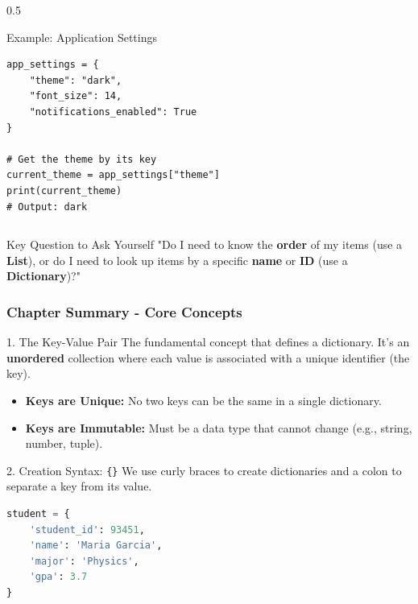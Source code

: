 \documentclass{beamer}
\begin{document}
\begin{frame}[fragile]
\begin{columns}[T]
\begin{column}{0.5\textwidth}
    \begin{block}{Example: Application Settings}
\begin{verbatim}
app_settings = {
    "theme": "dark",
    "font_size": 14,
    "notifications_enabled": True
}

# Get the theme by its key
current_theme = app_settings["theme"]
print(current_theme)
# Output: dark
\end{verbatim}
    \end{block}
\end{column}

\end{columns}

\vspace{1em}

\begin{alertblock}{Key Question to Ask Yourself}
"Do I need to know the \textbf{order} of my items (use a \textbf{List}), or do I need to look up items by a specific \textbf{name} or \textbf{ID} (use a \textbf{Dictionary})?"
\end{alertblock}

\end{frame}

\begin{frame}[fragile]
    \frametitle{Chapter Summary - Core Concepts}

    \begin{block}{1. The Key-Value Pair}
        The fundamental concept that defines a dictionary. It's an \textbf{unordered} collection where each value is associated with a unique identifier (the key).
        \begin{itemize}
            \item \textbf{Keys are Unique:} No two keys can be the same in a single dictionary.
            \item \textbf{Keys are Immutable:} Must be a data type that cannot change (e.g., string, number, tuple).
        \end{itemize}
    \end{block}

    \begin{block}{2. Creation Syntax: \texttt{\{\}}}
        We use curly braces to create dictionaries and a colon to separate a key from its value.
        \begin{lstlisting}[language=Python]
% A dictionary representing a student record
student = {
    'student_id': 93451,
    'name': 'Maria Garcia',
    'major': 'Physics',
    'gpa': 3.7
}
        \end{lstlisting}
    \end{block}
\end{frame}
\end{document}
